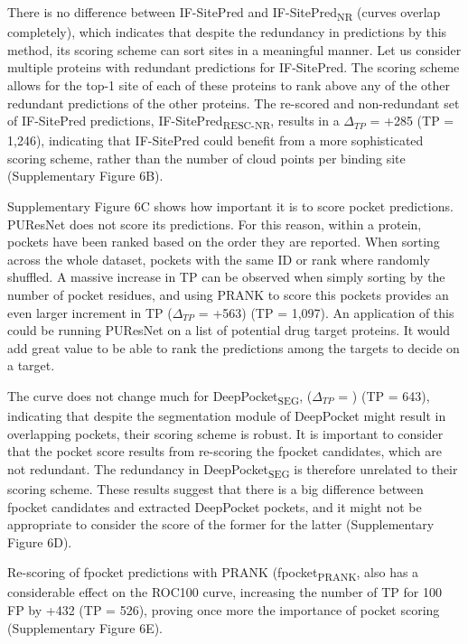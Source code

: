 There is no difference between IF-SitePred and IF-SitePred\textsubscript{NR} (curves overlap completely), which indicates that despite the redundancy in predictions by this method, its scoring scheme can sort sites in a meaningful manner. Let us consider multiple proteins with redundant predictions for IF-SitePred. The scoring scheme allows for the top-1 site of each of these proteins to rank above any of the other redundant predictions of the other proteins. The re-scored and non-redundant set of IF-SitePred predictions, IF-SitePred\textsubscript{RESC-NR}, results in a $\Delta_{TP}$ = +285 (TP = 1,246), indicating that IF-SitePred could benefit from a more sophisticated scoring scheme, rather than the number of cloud points per binding site (Supplementary Figure 6B).

Supplementary Figure 6C shows how important it is to score pocket predictions. PUResNet does not score its predictions. For this reason, within a protein, pockets have been ranked based on the order they are reported. When sorting across the whole dataset, pockets with the same ID or rank where randomly shuffled. A massive increase in TP can be observed when simply sorting by the number of pocket residues, and using PRANK to score this pockets provides an even larger increment in TP ($\Delta_{TP}$ = +563) (TP = 1,097). An application of this could be running PUResNet on a list of potential drug target proteins. It would add great value to be able to rank the predictions among the targets to decide on a target.

The curve does not change much for DeepPocket\textsubscript{SEG}, ($\Delta_{TP}$ = ) (TP = 643), indicating that despite the segmentation module of DeepPocket might result in overlapping pockets, their scoring scheme is robust. It is important to consider that the pocket score results from re-scoring the fpocket candidates, which are not redundant. The redundancy in DeepPocket\textsubscript{SEG} is therefore unrelated to their scoring scheme. These results suggest that there is a big difference between fpocket candidates and extracted DeepPocket pockets, and it might not be appropriate to consider the score of the former for the latter (Supplementary Figure 6D).

Re-scoring of fpocket predictions with PRANK (fpocket\textsubscript{PRANK}, also has a considerable effect on the ROC100 curve, increasing the number of TP for 100 FP by +432 (TP = 526), proving once more the importance of pocket scoring (Supplementary Figure 6E).

